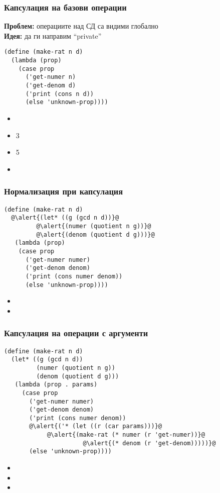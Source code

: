 \documentclass[alsotrans]{beamerswitch}
\begin{document}
\begin{frame}[fragile]
  \frametitle{Капсулация на базови операции}

  \textbf{Проблем:} операциите над СД са видими глобално\\[2ex]
  \pause
  \textbf{Идея:} да ги направим ``private''
  \pause
\begin{lstlisting}
(define (make-rat n d)
  (lambda (prop)
    (case prop
      ('get-numer n)
      ('get-denom d)
      ('print (cons n d))
      (else 'unknown-prop))))
\end{lstlisting}
  \pause
  \begin{itemize}
  \item {}
  \item {}3
  \item {}5
  \item {}
  \end{itemize}
\end{frame}

\begin{frame}[fragile]
  \frametitle{Нормализация при капсулация}

\begin{lstlisting}
(define (make-rat n d)
  @\alert{(let* ((g (gcd n d))}@
         @\alert{(numer (quotient n g))}@
         @\alert{(denom (quotient d g)))}@
   (lambda (prop)
    (case prop
      ('get-numer numer)
      ('get-denom denom)
      ('print (cons numer denom))
      (else 'unknown-prop))))
\end{lstlisting}
  \pause
  \begin{itemize}
  \item {}
  \item {}
  \end{itemize}
\end{frame}

\begin{frame}[fragile]
  \frametitle{Капсулация на операции с аргументи}

\small
\begin{lstlisting}
(define (make-rat n d)
  (let* ((g (gcd n d))
         (numer (quotient n g))
         (denom (quotient d g)))
   (lambda (prop . params)
     (case prop
       ('get-numer numer)
       ('get-denom denom)
       ('print (cons numer denom))
       @\alert{('* (let ((r (car params)))}@
            @\alert{(make-rat (* numer (r 'get-numer))}@
                      @\alert{(* denom (r 'get-denom)))))}@
       (else 'unknown-prop))))
\end{lstlisting}
  \pause
  \begin{itemize}
  \item {}
  \item {}
  \item {}
  \end{itemize}
\end{frame}
\end{document}
